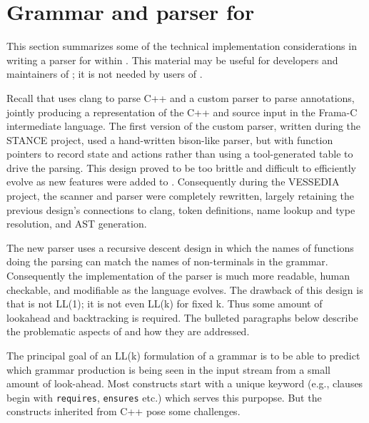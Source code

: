 \newcommand{\lang}{C++\xspace}
\chapter{Grammar and parser for \acslpp}
\label{sec:grammar}

This section summarizes some of the technical implementation considerations in writing a parser for \acslpp within \fclang. 
This material may be useful for developers and maintainers of \fclang; it is not needed by users of \fclang.

Recall that \fclang uses clang to parse \lang and a custom parser to parse \acslpp annotations, jointly producing a representation of the \lang and \acslpp source input in the Frama-C intermediate language. 
The first version of the \acslpp custom parser, written during the STANCE project, used a hand-written bison-like parser, but with function pointers to record state and actions rather than using a tool-generated table to drive the parsing. 
This design proved to be too brittle and difficult to efficiently evolve as new features were added to \acslpp. 
Consequently during the VESSEDIA project, the scanner and parser were completely rewritten, largely retaining the previous design's connections to clang, token definitions, name lookup and type resolution, and AST generation.

The new parser uses a recursive descent design in which the names of functions doing the parsing can match the names of non-terminals in the grammar. 
Consequently the implementation of the parser is much more readable, human checkable, and modifiable as the \acslpp language evolves. 
The drawback of this design is that \acslpp is not LL(1); it is not even LL(k) for fixed k. 
Thus some amount of lookahead and backtracking is required. 
The bulleted paragraphs below describe the problematic aspects of \acslpp and how they are addressed.

The principal goal of an LL(k) formulation of a grammar is to be able to predict which grammar production is being seen in the input stream from a small amount of look-ahead.
Most \acslpp constructs start with a unique keyword (e.g., clauses begin with \lstinline|requires|, \lstinline|ensures| etc.) which serves this purpopse. 
But the constructs inherited from \lang pose some challenges.

